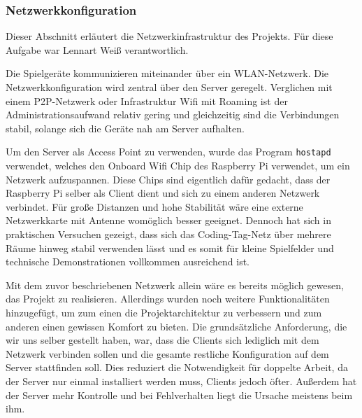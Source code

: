 \subsubsection{Netzwerkkonfiguration}
\label{sec:netzwerkkonfiguration}

Dieser Abschnitt erläutert die Netzwerkinfrastruktur des Projekts.
Für diese Aufgabe war Lennart Weiß verantwortlich.

Die Spielgeräte kommunizieren miteinander über ein WLAN-Netzwerk. Die
Netzwerkkonfiguration wird zentral über den Server geregelt. Verglichen mit
einem P2P-Netzwerk oder Infrastruktur Wifi mit Roaming ist der Administrationsaufwand
relativ gering und gleichzeitig sind die Verbindungen stabil, solange
sich die Geräte nah am Server aufhalten.

Um den Server als Access Point zu verwenden, wurde das Program \texttt{hostapd} verwendet,
welches den Onboard Wifi Chip des Raspberry Pi verwendet, um ein Netzwerk
aufzuspannen. Diese Chips sind eigentlich dafür gedacht, dass der Raspberry Pi
selber als Client dient und sich zu einem anderen Netzwerk verbindet. Für große
Distanzen und hohe Stabilität wäre eine externe Netzwerkkarte mit Antenne
womöglich besser geeignet. Dennoch hat sich in praktischen Versuchen gezeigt,
dass sich das Coding-Tag-Netz über mehrere Räume hinweg stabil verwenden lässt
und es somit für kleine Spielfelder und technische Demonstrationen vollkommen
ausreichend ist.

Mit dem zuvor beschriebenen Netzwerk allein wäre es bereits möglich gewesen,
das Projekt zu realisieren. Allerdings wurden noch weitere Funktionalitäten
hinzugefügt, um zum einen die Projektarchitektur zu verbessern und zum anderen
einen gewissen Komfort zu bieten. Die grundsätzliche Anforderung, die wir uns
selber gestellt haben, war, dass die Clients sich lediglich mit dem Netzwerk
verbinden sollen und die gesamte restliche Konfiguration auf dem Server 
stattfinden soll. Dies reduziert die Notwendigkeit für doppelte Arbeit, da der
Server nur einmal installiert werden muss, Clients jedoch öfter. Außerdem hat
der Server mehr Kontrolle und bei Fehlverhalten liegt die Ursache meistens beim
ihm.

